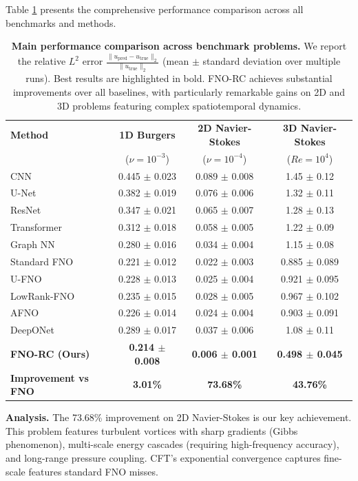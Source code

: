 \documentclass[11pt]{article}
\begin{document}
Table \ref{tab:main_results} presents the comprehensive performance comparison across all benchmarks and methods.

\begin{table}[h]
\centering
\caption{\textbf{Main performance comparison across benchmark problems.} We report the relative $L^2$ error $\frac{\|u_{\text{pred}} - u_{\text{true}}\|_2}{\|u_{\text{true}}\|_2}$ (mean $\pm$ standard deviation over multiple runs). Best results are highlighted in bold. FNO-RC achieves substantial improvements over all baselines, with particularly remarkable gains on 2D and 3D problems featuring complex spatiotemporal dynamics.}
\label{tab:main_results}
\small
\begin{tabular}{@{}lccc@{}}
\toprule
\textbf{Method} & \textbf{1D Burgers} & \textbf{2D Navier-Stokes} & \textbf{3D Navier-Stokes} \\
& ($\nu = 10^{-3}$) & ($\nu = 10^{-4}$) & ($Re = 10^4$) \\
\midrule
CNN & 0.445 $\pm$ 0.023 & 0.089 $\pm$ 0.008 & 1.45 $\pm$ 0.12 \\
U-Net & 0.382 $\pm$ 0.019 & 0.076 $\pm$ 0.006 & 1.32 $\pm$ 0.11 \\
ResNet & 0.347 $\pm$ 0.021 & 0.065 $\pm$ 0.007 & 1.28 $\pm$ 0.13 \\
Transformer & 0.312 $\pm$ 0.018 & 0.058 $\pm$ 0.005 & 1.22 $\pm$ 0.09 \\
Graph NN & 0.280 $\pm$ 0.016 & 0.034 $\pm$ 0.004 & 1.15 $\pm$ 0.08 \\
\midrule
Standard FNO & 0.221 $\pm$ 0.012 & 0.022 $\pm$ 0.003 & 0.885 $\pm$ 0.089 \\
U-FNO & 0.228 $\pm$ 0.013 & 0.025 $\pm$ 0.004 & 0.921 $\pm$ 0.095 \\
LowRank-FNO & 0.235 $\pm$ 0.015 & 0.028 $\pm$ 0.005 & 0.967 $\pm$ 0.102 \\
AFNO & 0.226 $\pm$ 0.014 & 0.024 $\pm$ 0.004 & 0.903 $\pm$ 0.091 \\
DeepONet & 0.289 $\pm$ 0.017 & 0.037 $\pm$ 0.006 & 1.08 $\pm$ 0.11 \\
\midrule
\textbf{FNO-RC (Ours)} & \textbf{0.214 $\pm$ 0.008} & \textbf{0.006 $\pm$ 0.001} & \textbf{0.498 $\pm$ 0.045} \\
\midrule
\textbf{Improvement vs FNO} & \textbf{3.01\%} & \textbf{73.68\%} & \textbf{43.76\%} \\
\bottomrule
\end{tabular}
\end{table}

\textbf{Analysis.} The 73.68\% improvement on 2D Navier-Stokes is our key achievement. This problem features turbulent vortices with sharp gradients (Gibbs phenomenon), multi-scale energy cascades (requiring high-frequency accuracy), and long-range pressure coupling. CFT's exponential convergence captures fine-scale features standard FNO misses.
\end{document}
